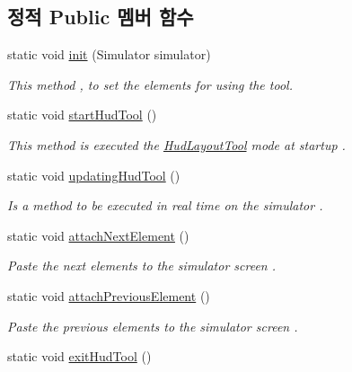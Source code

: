 \subsection*{정적 Public 멤버 함수}
\begin{DoxyCompactItemize}
\item 
static void \hyperlink{classkr_1_1ac_1_1kookmin_1_1cs_1_1tool_1_1_hud_layout_tool_a93ebf652629e4e65a6126d478143630b}{init} (Simulator simulator)
\begin{DoxyCompactList}\small\item\em This method , to set the elements for using the tool. \end{DoxyCompactList}\item 
static void \hyperlink{classkr_1_1ac_1_1kookmin_1_1cs_1_1tool_1_1_hud_layout_tool_a6f5f4dcaf3b5aeee139ab80fb3aa30aa}{start\+Hud\+Tool} ()
\begin{DoxyCompactList}\small\item\em This method is executed the \hyperlink{classkr_1_1ac_1_1kookmin_1_1cs_1_1tool_1_1_hud_layout_tool}{Hud\+Layout\+Tool} mode at startup . \end{DoxyCompactList}\item 
static void \hyperlink{classkr_1_1ac_1_1kookmin_1_1cs_1_1tool_1_1_hud_layout_tool_a1206c4b2c371bbbe24cf257492826574}{updating\+Hud\+Tool} ()
\begin{DoxyCompactList}\small\item\em Is a method to be executed in real time on the simulator . \end{DoxyCompactList}\item 
static void \hyperlink{classkr_1_1ac_1_1kookmin_1_1cs_1_1tool_1_1_hud_layout_tool_a2105ce4edf93ec4dea92c388b98f7941}{attach\+Next\+Element} ()
\begin{DoxyCompactList}\small\item\em Paste the next elements to the simulator screen . \end{DoxyCompactList}\item 
static void \hyperlink{classkr_1_1ac_1_1kookmin_1_1cs_1_1tool_1_1_hud_layout_tool_a5d9309d71fd9b0af0e6505d079bf7897}{attach\+Previous\+Element} ()
\begin{DoxyCompactList}\small\item\em Paste the previous elements to the simulator screen . \end{DoxyCompactList}\item 
static void \hyperlink{classkr_1_1ac_1_1kookmin_1_1cs_1_1tool_1_1_hud_layout_tool_aa05a256bff284acae80d81b6eb3da383}{exit\+Hud\+Tool} ()

\end{DoxyCompactItemize}
